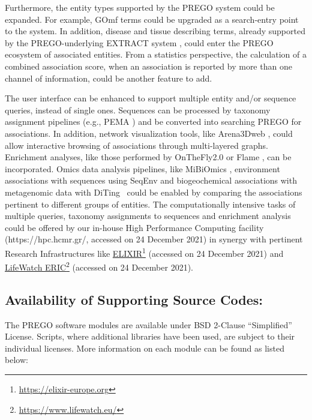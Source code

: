 {   Furthermore, the entity types supported by the PREGO system could be expanded. For example, GOmf terms could be upgraded as a search-entry point to the system. 
   In addition, disease and tissue describing terms, already supported by the PREGO-underlying EXTRACT system \cite{pafilis2016extract}, could enter the PREGO ecosystem of associated entities. 
   From a statistics perspective, the calculation of a combined association score, when an association is reported by more than one channel of information, could be another feature to add.

   The user interface can be enhanced to support multiple entity and/or sequence queries, instead of single ones. 
   Sequences can be processed by taxonomy assignment pipelines (e.g., PEMA \cite{zafeiropoulos2020pema}) and be converted into searching PREGO for associations. 
   In addition, network visualization tools, like Arena3Dweb \cite{karatzas2021arena3dweb}, could allow interactive browsing of associations through multi-layered graphs. 
   Enrichment analyses, like those performed by OnTheFly2.0 \cite{baltoumas2021onthefly2} or Flame \cite{thanati2021flame}, 
   can be incorporated. 
   Omics data analysis pipelines, like MiBiOmics \cite{zoppi2021mibiomics}, environment associations with sequences using SeqEnv \cite{sinclair2016seqenv} and biogeochemical associations with metagenomic data with DiTing~\cite{xue_diting_2021} could be enabled by comparing the associations pertinent to different groups of entities. 
   The computationally intensive tasks of multiple queries, taxonomy assignments to sequences and enrichment analysis could be offered by our in-house High Performance Computing facility (https://hpc.hcmr.gr/, accessed on 24 December 2021) \cite{zafeiropoulos_0s_2021} in synergy with pertinent Research Infrastructures like \href{https://elixir-europe.org}{ELIXIR}\footnote{\href{https://elixir-europe.org}{https://elixir-europe.org}} (accessed on 24 December 2021) and \href{https://www.lifewatch.eu/}{LifeWatch ERIC}\footnote{\href{https://www.lifewatch.eu/}{https://www.lifewatch.eu/}} (accessed on 24 December 2021).



   \subsection*{Availability of Supporting Source Codes:} 
   The PREGO software modules are available under BSD 2-Clause “Simplified” License. Scripts, where additional libraries have been used, are subject to their individual licenses. More information on each module can be found as listed below:
   
}
